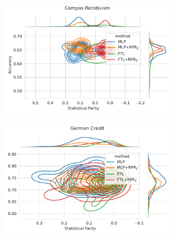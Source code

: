 \begin{figure}
\begin{subfigure}{.45\linewidth}
    \includegraphics[width=1\linewidth]{images/pareto_acc_parity_compas_rpr.pdf}
\end{subfigure}
\begin{subfigure}{.45\linewidth}
    \includegraphics[width=1\linewidth]{images/pareto_acc_parity_german_rpr.pdf}
\end{subfigure}
\end{figure}


